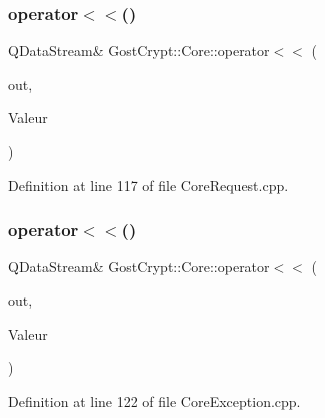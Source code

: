 \mbox{\label{namespace_gost_crypt_1_1_core_a581eef0582497ef8fa67dc14ad5001c3}} 
\subsubsection{\texorpdfstring{operator$<$$<$()}{operator<<()}\hspace{0.1cm}{\footnotesize\ttfamily [19/56]}}
{\footnotesize\ttfamily Q\+Data\+Stream\& Gost\+Crypt\+::\+Core\+::operator$<$$<$ (\begin{DoxyParamCaption}\item[{Q\+Data\+Stream \&}]{out,  }\item[{const \hyperlink{struct_gost_crypt_1_1_core_1_1_create_key_file_request}{Create\+Key\+File\+Request} \&}]{Valeur }\end{DoxyParamCaption})}



Definition at line 117 of file Core\+Request.\+cpp.

\mbox{\label{namespace_gost_crypt_1_1_core_aa74220910bf9415a6548f6e5b6d81f0c}} 
\subsubsection{\texorpdfstring{operator$<$$<$()}{operator<<()}\hspace{0.1cm}{\footnotesize\ttfamily [20/56]}}
{\footnotesize\ttfamily Q\+Data\+Stream\& Gost\+Crypt\+::\+Core\+::operator$<$$<$ (\begin{DoxyParamCaption}\item[{Q\+Data\+Stream \&}]{out,  }\item[{const \hyperlink{class_gost_crypt_1_1_core_1_1_mount_filesystem_manager_exception}{Gost\+Crypt\+::\+Core\+::\+Mount\+Filesystem\+Manager\+Exception} \&}]{Valeur }\end{DoxyParamCaption})}



Definition at line 122 of file Core\+Exception.\+cpp.

\mbox{\label{namespace_gost_crypt_1_1_core_ac9374a55d3cf082a48ed8cb39a63cd1d}} 
